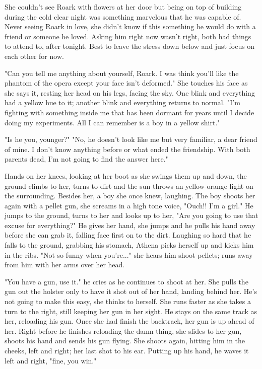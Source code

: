         She couldn't see Roark with flowers at her door but being on top of building during the cold clear night was something marvelous that
    he was capable of. Never seeing Roark in love, she didn't know if this something he would do with a friend or someone he loved. Asking him
    right now wasn't right, both had things to attend to, after tonight. Best to leave the stress down below and just focus on each other for
    now.

        "Can you tell me anything about yourself, Roark. I was think you'll like the phantom of the opera except your face isn't deformed." She
    touches his face as she says it, resting her head on his legs, facing the sky. One blink and everything had a yellow hue to it; another 
    blink and everything returns to normal. "I'm fighting with something inside me that has been dormant for years until I decide doing my
    experiments. All I can remember is a boy in a yellow shirt."

        "Is he you, younger?" "No, he doesn't look like me but very familiar, a dear friend of mine. I don't know anything before or what ended
    the friendship. With both parents dead, I'm not going to find the answer here."

        Hands on her knees, looking at her boot as she swings them up and down, the ground climbs to her, turns to dirt and the sun throws an
    yellow-orange light on the surrounding. Besides her, a boy she once knew, laughing. The boy shoots her again with a pellet gun, she screams
    in a high tone voice, "Ouch!! I'm a girl." He jumps to the ground, turns to her and looks up to her, "Are you going to use that excuse for
    everything?" He gives her hand, she jumps and he pulls his hand away before she can grab it, falling face first on to the dirt. Laughing
    so hard that he falls to the ground, grabbing his stomach, Athena picks herself up and kicks him in the ribs. "Not so funny when you're..."
    she hears him shoot pellets; runs away from him with her arms over her head.

        "You have a gun, use it." he cries as he continues to shoot at her. She pulls the gun out the holster only to have it shot out of her
    hand, landing behind her. He's not going to make this easy, she thinks to herself. She runs faster as she takes a turn to the right, still
    keeping her gun in her sight. He stays on the same track as her, reloading his gun. Once she had finish the backtrack, her gun is up ahead
    of her. Right before he finishes reloading the damn thing, she slides to her gun, shoots his hand and sends his gun flying. She shoots again,
    hitting him in the cheeks, left and right; her last shot to his ear. Putting up his hand, he waves it left and right, "fine, you win."

